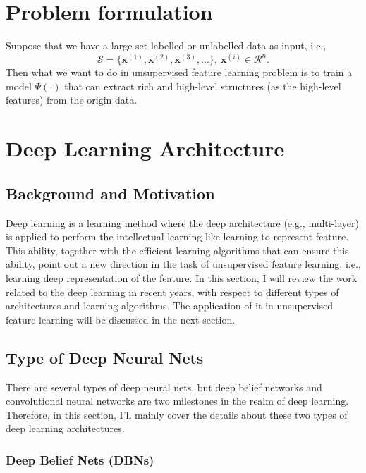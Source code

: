 \documentclass[conference]{IEEEtran}
\begin{document}
\section{Problem formulation}

Suppose that we have a large set labelled or unlabelled data as input, i.e., $$\mathcal{S}=\{\mathbf{x}^{(1)},\mathbf{x}^{(2)},\mathbf{x}^{(3)},\ldots\}, \ \mathbf{x}^{(i)}\in\mathcal{R}^n.$$ Then what we want to do in unsupervised feature learning problem is to train a model $\Psi(\cdot)$ that can extract rich and high-level structures (as the high-level features) from the origin data.

\section{Deep Learning Architecture}

\subsection{Background and Motivation}

Deep learning is a learning method where the deep architecture (e.g., multi-layer) is applied to perform the intellectual learning like learning to represent feature. This ability, together with the efficient learning algorithms that can ensure this ability, point out a new direction in the task of unsupervised feature learning, i.e., learning deep representation of the feature. In this section, I will review the work related to the deep learning in recent years, with respect to different types of architectures and learning algorithms. The application of it in unsupervised feature learning will be discussed in the next section.


\subsection{Type of Deep Neural Nets}

There are several types of deep neural nets, but deep belief networks and convolutional neural networks are two milestones in the realm of deep learning. Therefore, in this section, I'll mainly cover the details about these two types of deep learning architectures.

\subsubsection{Deep Belief Nets (DBNs)}
\end{document}
